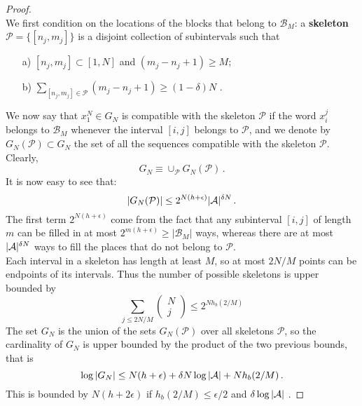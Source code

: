 \begin{proof}
    \hfill \\
    We first condition on the locations of the blocks that belong to $\mathcal{B}_M$: a \textbf{skeleton} $\mathcal{P}= \{ [n_j, m_j] \}$ is a disjoint collection of subintervals such that
    \begin{itemize}
        \item[a)] $[n_j, m_j] \subset [1,N]$ and $ (m_j - n_j + 1) \geq M$;
        \item[b)] $\sum_{[n_j, m_j] \in \mathcal{P}} (m_j - n_j + 1) \geq (1 - \delta) N $  . 
    \end{itemize}
    We now say that $x_1^N \in G_N$ is compatible with the skeleton $\mathcal{P}$  if the word $x_i^j$ belongs to $\mathcal{B}_M$ whenever the interval $[i,j]$ belongs to $\mathcal{P}$, and we denote by $G_N(\mathcal{P}) \subset G_N$ the set of all the sequences compatible with the skeleton $\mathcal{P}$. \\
    Clearly,
    \begin{equation*}
        G_N \equiv \cup_{\mathcal{P}} G_N (\mathcal{P}) \, .
    \end{equation*}
    It is now easy to see that:
    \begin{equation*}
        |G_N (\mathcal{P})| \leq 2^{N (h+\epsilon)} |\mathcal{A}|^{\delta N} \, .
    \end{equation*}
    The first term $2^{N (h+\epsilon)}$ come from the fact that any subinterval $[i, j]$ of length $m$ can be filled in at most $2^{m (h+\epsilon)} \geq |\mathcal{B}_M|$ ways, whereas there are at most $|\mathcal{A}|^{\delta N}$ ways to fill the places that do not belong to $\mathcal{P}$.\\
    Each interval in a skeleton has length at least $M$, so at most $2N/M$ points can be endpoints of its intervals. Thus the number of possible skeletons is upper bounded by
    \begin{equation*}
        \sum_{j \leq 2N/M} 
        \begin{pmatrix}
            N \\
            j
        \end{pmatrix}
        \leq 2^{N h_b (2/M)}
    \end{equation*}
    The set $G_N$ is the union of the sets $G_N(\mathcal{P})$ over all skeletons $\mathcal{P}$, so the cardinality of $G_N$ is upper bounded by the product of the two previous bounds, that is
    \begin{equation*}
        \log |G_N| \leq N (h + \epsilon) + \delta N \log |\mathcal{A}| + N h_b (2/M) \, .
    \end{equation*}
    This is bounded by $N (h + 2\epsilon)$ if $h_b (2/M) \leq \epsilon/2$ and $\delta \log |\mathcal{A}|$ .
\end{proof}

